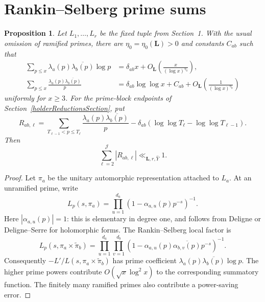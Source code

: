 \documentclass[oneside, 12pt]{amsart}
\newtheorem{prop}[thm]{Proposition}
\theoremstyle{definition}
\begin{document}
	{\section{Rankin--Selberg prime sums}\label{appendixRankinSelberg}
		\begin{prop}\label{rankinSelbergPrimeSumsProposition}
			Let $L_1,\ldots,L_r$ be the fixed tuple from Section~1.
			With the usual omission of ramified primes, there are
			$\eta_0=\eta_0(\boldsymbol L)>0$ and constants $C_{ab}$ such that
			\begin{align}
				\sum_{p\leq x}\lambda_a(p)\overline{\lambda_b(p)}\log p
				&=\delta_{ab}x+
				O_{\boldsymbol L}\left(\frac{x}{(\log x)^{\eta_0}}\right),
				\label{rankinSelbergQuantitativePrimeTheorem}\\
				\sum_{p\leq x}\frac{\lambda_a(p)\overline{\lambda_b(p)}}p
				&=\delta_{ab}\log\log x+C_{ab}
				+O_{\boldsymbol L}\left(\frac1{(\log x)^{\eta_0}}\right)
				\label{rankinSelbergQuantitativeMertens}
			\end{align}
			uniformly for $x\geq3$.  For the prime-block endpoints of
			Section~\ref{holderReductionsSection}, put
			\[
			R_{ab,\ell}=
			\sum_{T_{\ell-1}<p\leq T_\ell}
			\frac{\lambda_a(p)\overline{\lambda_b(p)}}p
			-\delta_{ab}(\log\log T_\ell-\log\log T_{\ell-1}).
			\]
			Then
			\begin{equation}\label{rankinSelbergBlockUniformity}
				\sum_{\ell=2}^{\mathscr J}|R_{ab,\ell}|
				\ll_{\boldsymbol L,r,\widehat Y}1.
			\end{equation}
		\end{prop}
		
		\begin{proof}
			Let $\pi_a$ be the unitary automorphic representation attached to $L_a$.
			At an unramified prime, write
			\[
			L_p(s,\pi_a)=\prod_{u=1}^{d_a}
			(1-\alpha_{a,u}(p)p^{-s})^{-1}.
			\]
			Here $|\alpha_{a,u}(p)|=1$: this is elementary in degree one,
			and follows from Deligne \cite{Deligne} or Deligne--Serre
			\cite{DeligneSerre} for holomorphic forms.
			The Rankin--Selberg local factor is
			\[
			L_p(s,\pi_a\times\widetilde\pi_b)
			=\prod_{u=1}^{d_a}\prod_{v=1}^{d_b}
			(1-\alpha_{a,u}(p)\overline{\alpha_{b,v}(p)}p^{-s})^{-1}.
			\]
			Consequently $-L'/L(s,\pi_a\times\widetilde\pi_b)$ has prime coefficient
			$\lambda_a(p)\overline{\lambda_b(p)}\log p$.
			The higher prime powers contribute $O(\sqrt x\log^2x)$ to the
			corresponding summatory function.  The finitely many ramified primes
			also contribute a power-saving error.
			

\end{proof}}
\end{document}
